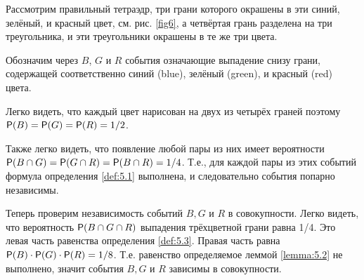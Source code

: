 \begin{example}
\label{ex:5.5}

Рассмотрим правильный тетраэдр, три грани которого окрашены в эти синий, зелёный, и красный цвет, см. рис. \ref{fig6},
а четвёртая грань разделена на три треугольника, и эти треугольники окрашены в те же три цвета. 

Обозначим через $B$, $G$ и $R$ события означающие выпадение снизу грани, содержащей соответственно синий (blue), зелёный (green), и красный (red) цвета.


Легко видеть, что каждый цвет нарисован на двух из четырёх граней
поэтому $\P(B) = \P(G) = \P(R) = 1/2$. 

Также легко видеть, что появление любой пары из них имеет вероятности $\P(B\cap G) = \P(G\cap R) = \P(B\cap R) = 1/4$. Т.е., для каждой пары из этих событий формула определения \ref{def:5.1} выполнена, и
следовательно события попарно независимы.

Теперь проверим независимость событий $B, G$ и $R$ в совокупности. Легко
видеть, что вероятность $\P(B \cap  G \cap  R)$ выпадения трёхцветной грани равна
1/4. Это левая часть равенства определения \ref{def:5.3}. Правая часть равна $\P(B) \cdot \P(G) \cdot
\P(R) = 1/8$. Т.е. равенство определяемое леммой \ref{lemma:5.2} не выполнено, значит события $B, G$
и $R$ зависимы в совокупности.
\end{example}


